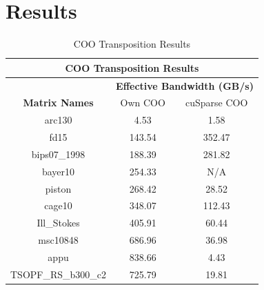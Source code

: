\documentclass{IEEEconf}
\begin{document}
\section{Results}
\begin{table}[h]
    \begin{tabular}{|ccc|}
    \hline
    \multicolumn{3}{|c|}{\textbf{COO Transposition Results}}                                               \\ \hline
    \multicolumn{1}{|l|}{}                      & \multicolumn{2}{c|}{\textbf{Effective Bandwidth (GB/s)}} \\ \hline
    \multicolumn{1}{|c|}{\textbf{Matrix Names}} & \multicolumn{1}{c|}{Own COO}        & cuSparse COO       \\ \hline
    \multicolumn{1}{|c|}{arc130}                & \multicolumn{1}{c|}{4.53}           & 1.58               \\ \hline
    \multicolumn{1}{|c|}{fd15}                  & \multicolumn{1}{c|}{143.54}         & 352.47             \\ \hline
    \multicolumn{1}{|c|}{bips07\_1998}          & \multicolumn{1}{c|}{188.39}         & 281.82             \\ \hline
    \multicolumn{1}{|c|}{bayer10}               & \multicolumn{1}{c|}{254.33}         & N/A                \\ \hline
    \multicolumn{1}{|c|}{piston}                & \multicolumn{1}{c|}{268.42}         & 28.52              \\ \hline
    \multicolumn{1}{|c|}{cage10}                & \multicolumn{1}{c|}{348.07}         & 112.43             \\ \hline
    \multicolumn{1}{|c|}{Ill\_Stokes}           & \multicolumn{1}{c|}{405.91}         & 60.44              \\ \hline
    \multicolumn{1}{|c|}{msc10848}              & \multicolumn{1}{c|}{686.96}         & 36.98              \\ \hline
    \multicolumn{1}{|c|}{appu}                  & \multicolumn{1}{c|}{838.66}         & 4.43               \\ \hline
    \multicolumn{1}{|c|}{TSOPF\_RS\_b300\_c2}   & \multicolumn{1}{c|}{725.79}         & 19.81              \\ \hline
    \end{tabular}
    \caption{COO Transposition Results}
    \label{tab:coo_results}
\end{table}
\end{document}
